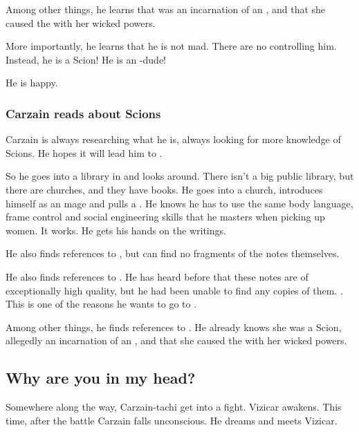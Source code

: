 Among other things, he learns that \Belzir{} was an incarnation of an  \malach, and that she caused the \HundredScourges{} with her wicked \malach{} powers. 

More importantly, he learns that he is not mad. 
There are no \qliphoth{} controlling him. 
Instead, he is a Scion! 
He is an \uber-dude! 

He is happy. 









\subsubsection{Carzain reads about Scions}
Carzain is always researching what he is, always looking for more knowledge of Scions. 
He hopes it will lead him to \apotheosis. 

So he goes into a library in \Forclin{} and looks around. 
There isn't a big public library, but there are churches, and they have books. 
He goes into a church, introduces himself as an \ishrah{} mage and pulls a .
He knows he has to use the same body language, frame control and social engineering skills that he masters when picking up women.
It works.
He gets his hands on the writings.

He also finds references to , but can find no fragments of the notes themselves. 

He also finds references to . 
He has heard before that these notes are of exceptionally high quality, but he had been unable to find any copies of them. 
. 
This is one of the reasons he wants to go to \Redce. 

Among other things, he finds references to \Belzir. 
He already knows she was a Scion, allegedly an incarnation of an  \malach, and that she caused the \HundredScourges with her wicked \malach powers. 









\subsection{Why are you in my head?}
Somewhere along the way, Carzain-tachi get into a fight. Vizicar awakens. This time, after the battle Carzain falls unconscious. He dreams and meets Vizicar. 

